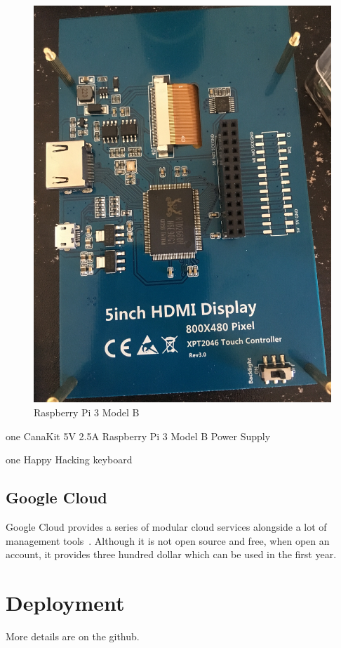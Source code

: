 \begin{figure}[!ht]
  \centering\includegraphics[width=\columnwidth]{images/display.jpeg}
  \caption{Raspberry Pi 3 Model B}\label{f:fly}
\end{figure}

one CanaKit 5V 2.5A Raspberry Pi 3 Model B Power Supply

one Happy Hacking keyboard

\subsection{Google Cloud}
Google Cloud provides a series of modular cloud services alongside a lot of
 management tools~\cite{hid-sp18-508-googleCloud}. Although
  it is not open source and free, when open an account,
 it provides three hundred dollar which can be used in the first year.
 
 \section{Deployment}
 More details are on the github.
